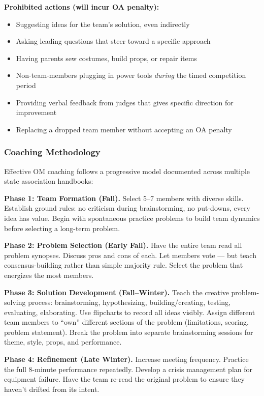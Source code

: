 \documentclass[11pt,letterpaper]{article}
\begin{document}
\textbf{Prohibited actions (will incur OA penalty):}
\begin{itemize}[leftmargin=2em]
\item Suggesting ideas for the team's solution, even indirectly
\item Asking leading questions that steer toward a specific approach
\item Having parents sew costumes, build props, or repair items
\item Non-team-members plugging in power tools \emph{during} the timed competition period
\item Providing verbal feedback from judges that gives specific direction for improvement
\item Replacing a dropped team member without accepting an OA penalty
\end{itemize}

\subsubsection{Coaching Methodology}

Effective OM coaching follows a progressive model documented across multiple state association handbooks:

\textbf{Phase 1: Team Formation (Fall).} Select 5--7 members with diverse skills. Establish ground rules: no criticism during brainstorming, no put-downs, every idea has value. Begin with spontaneous practice problems to build team dynamics before selecting a long-term problem.

\textbf{Phase 2: Problem Selection (Early Fall).} Have the entire team read all problem synopses. Discuss pros and cons of each. Let members vote --- but teach consensus-building rather than simple majority rule. Select the problem that energizes the most members.

\textbf{Phase 3: Solution Development (Fall--Winter).} Teach the creative problem-solving process: brainstorming, hypothesizing, building/creating, testing, evaluating, elaborating. Use flipcharts to record all ideas visibly. Assign different team members to ``own'' different sections of the problem (limitations, scoring, problem statement). Break the problem into separate brainstorming sessions for theme, style, props, and performance.

\textbf{Phase 4: Refinement (Late Winter).} Increase meeting frequency. Practice the full 8-minute performance repeatedly. Develop a crisis management plan for equipment failure. Have the team re-read the original problem to ensure they haven't drifted from its intent.
\end{document}
